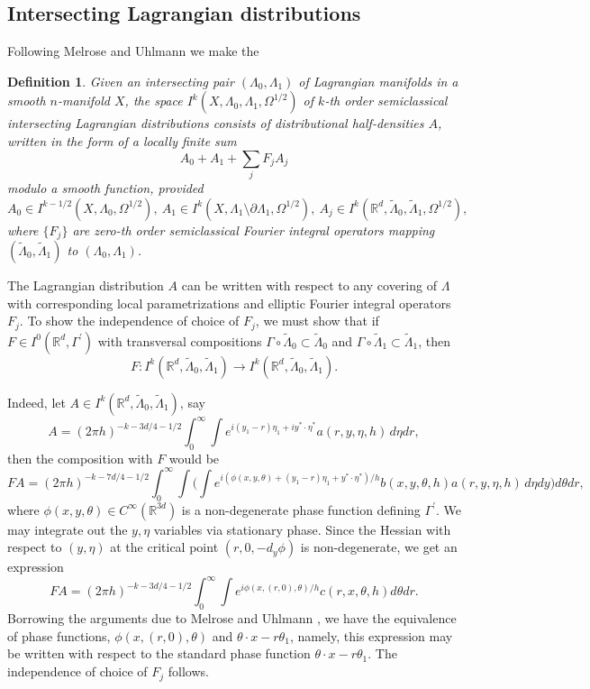 \documentclass[10pt, a4paper, twoside]{amsart}
\numberwithin{equation}{section}
\newtheorem{definition}[theorem]{Definition}
\theoremstyle{remark}
\begin{document}
\begin{appendix}
	
	
	
	
	\subsection{Intersecting Lagrangian distributions}
	Following Melrose and Uhlmann \cite{Melrose-Uhlmann-CPAM-1979} we make the 
	\begin{definition}Given an intersecting pair $(\Lambda_0, \Lambda_1)$ of Lagrangian manifolds in a smooth $n$-manifold $X$, the space $I^k(X, \Lambda_0, \Lambda_1, \Omega^{1/2})$ of $k$-th order semiclassical intersecting Lagrangian distributions  consists of distributional half-densities $A$, written in the form of a locally finite sum $$A_0 + A_1 + \sum_j F_j A_j$$modulo a smooth function, provided $$A_0 \in I^{k - 1/2}(X, \Lambda_0, \Omega^{1/2}), \ A_1 \in I^{k}(X, \Lambda_1 \setminus \partial \Lambda_1, \Omega^{1/2}), \ A_j \in I^k(\mathbb{R}^d, \tilde{\Lambda}_0, \tilde{\Lambda}_1, \Omega^{1/2}),$$ where $\{F_j\}$ are zero-th order semiclassical Fourier integral operators mapping $(\tilde{\Lambda}_0, \tilde{\Lambda}_1)$ to $(\Lambda_0, \Lambda_1)$.\end{definition}
	
	The Lagrangian distribution $A$ can be written with respect to any covering of $\Lambda$ with corresponding local parametrizations and elliptic Fourier integral operators $F_j$. To show the independence of choice of $F_j$, we must show that if $F \in I^0(\mathbb{R}^d, \Gamma^\prime)$ with transversal compositions $\Gamma \circ \tilde{\Lambda}_0 \subset \tilde{\Lambda}_0$ and $\Gamma \circ \tilde{\Lambda}_1 \subset \tilde{\Lambda}_1$, then \begin{equation}\label{independence-F} F: I^k(\mathbb{R}^d, \tilde{\Lambda}_0, \tilde{\Lambda}_1) \longrightarrow I^k(\mathbb{R}^d, \tilde{\Lambda}_0, \tilde{\Lambda}_1).
	\end{equation}
	
	Indeed, let $A \in I^k(\mathbb{R}^d, \tilde{\Lambda}_0, \tilde{\Lambda}_1)$, say $$A = (2\pi h)^{- k - 3d/4 - 1/2}\int_0^\infty \int e^{i(y_1 - r) \eta_1 + i y^\ast \cdot \eta^\ast} a(r, y, \eta, h) \,d\eta dr,$$ then the composition with $F$ would be $$FA = (2\pi h)^{- k - 7d/4 - 1/2} \int_0^\infty \int \bigg( \int e^{i(\phi(x, y, \theta) + (y_1 - r) \eta_1 +  y^\ast \cdot \eta^\ast)/h} b(x, y, \theta, h)   a(r, y, \eta, h) \,d\eta dy \bigg) d\theta dr,$$ where $\phi(x, y, \theta) \in C^\infty(\mathbb{R}^{3d})$ is a non-degenerate phase function defining $\Gamma^\prime$. We may integrate out the $y, \eta$ variables via stationary phase. Since the Hessian with respect to $(y, \eta)$ at the critical point $(r, 0, - d_y \phi)$ is non-degenerate, we get an expression
	$$FA = (2\pi h)^{- k - 3d/4 - 1/2} \int_0^\infty \int e^{i \phi(x, (r, 0), \theta)/h} c(r, x, \theta, h) d\theta dr.$$ 
	Borrowing the arguments due to Melrose and Uhlmann \cite{Melrose-Uhlmann-CPAM-1979}, we have the equivalence of phase functions, $\phi(x, (r, 0), \theta)$ and $\theta \cdot x - r \theta_1$, namely, this expression may be written with respect to the standard phase function $\theta \cdot x - r \theta_1$.  The independence of choice of $F_j$ follows. 
	

\end{appendix}
\end{document}
